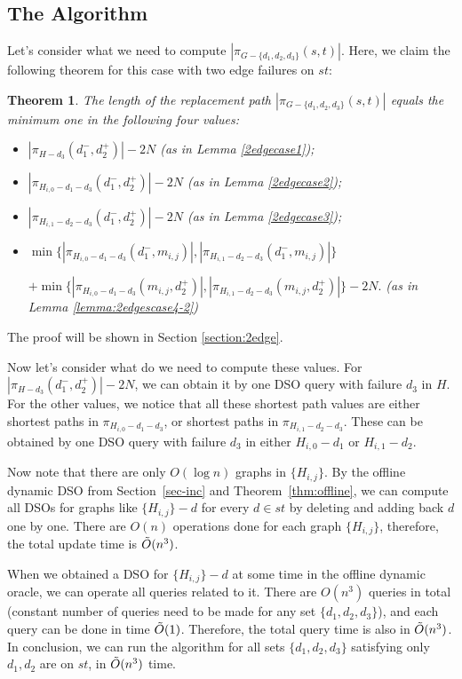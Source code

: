 \documentclass[11pt]{article}
\theoremstyle{plain}
\newtheorem{theorem}{Theorem}[section]
\theoremstyle{definition}
\newcommand{\set}[1]{\{ #1 \}}
\newcommand{\og}[3]{\pi_{G-#3}\left(#1,#2\right)}
\newcommand{\hg}[3]{\pi_{H-#3}\left(#1,#2\right)}
\begin{document}
\subsection{The Algorithm}

Let's consider what we need to compute $|\og{s}{t}{\set{d_1,d_2,d_3}}|$. Here, we claim the following theorem for this case with two edge failures on $st$:

\begin{theorem}\label{theorem:2edge}
The length of the replacement path $|\og{s}{t}{\set{d_1, d_2, d_3}}|$ equals the minimum one in the following four values:
\begin{itemize}
    \item $|\hg{d_1^-}{d_2^+}{d_3}|-2N$ (as in Lemma \ref{2edgecase1});
    \item $|\pi_{H_{i,0}-d_1-d_3}(d_1^-,d_2^+)|-2N$ (as in Lemma \ref{2edgecase2});
    \item $|\pi_{H_{i,1}-d_2-d_3}(d_1^-,d_2^+)|-2N$ (as in Lemma \ref{2edgecase3});
    \item $\min\{|\pi_{H_{i,0}-d_1-d_3}(d_1^-,m_{i,j})|,|\pi_{H_{i,1}-d_2-d_3}(d_1^-,m_{i,j})|\}$
        
         $+ \min\{|\pi_{H_{i,0}-d_1-d_3}(m_{i,j},d_2^+)|,|\pi_{H_{i,1}-d_2-d_3}(m_{i,j},d_2^+)|\}-2N.$ (as in Lemma \ref{lemma:2edgescase4-2})
\end{itemize}

\end{theorem}

The proof will be shown in Section \ref{section:2edge}. 

Now let's consider what do we need to compute these values. For $|\hg{d_1^-}{d_2^+}{d_3}|-2N$, we can obtain it by one DSO query with failure $d_3$ in $H$. For the other values, we notice that all these shortest path values are either shortest paths in $\pi_{H_{i,0}-d_1-d_3}$, or shortest paths in $\pi_{H_{i,1}-d_2-d_3}$. These can be obtained by one DSO query with failure $d_3$ in either $H_{i,0}-d_1$ or $H_{i,1}-d_2$.

Now note that there are only $O(\log n)$ graphs in $\set{H_{i,j}}$. By the offline dynamic DSO from Section~\ref{sec-inc} and Theorem~\ref{thm:offline}, we can compute all DSOs for graphs like $\set{H_{i,j}}-d$ for every $d \in st$ by deleting and adding back $d$ one by one. There are $O(n)$ operations done for each graph $\set{H_{i,j}}$, therefore, the total update time is $\Tilde{O}(n^3)$.

When we obtained a DSO for $\set{H_{i,j}}-d$ at some time in the offline dynamic oracle, we can operate all queries related to it. There are $O(n^3)$ queries in total (constant number of queries need to be made for any set $\set{d_1,d_2,d_3}$), and each query can be done in time $\Tilde{O}(1)$. Therefore, the total query time is also in $\Tilde{O}(n^3)$. In conclusion, we can run the algorithm for all sets $\set{d_1,d_2,d_3}$ satisfying only $d_1,d_2$ are on $st$, in $\Tilde{O}(n^3)$ time.
\end{document}
